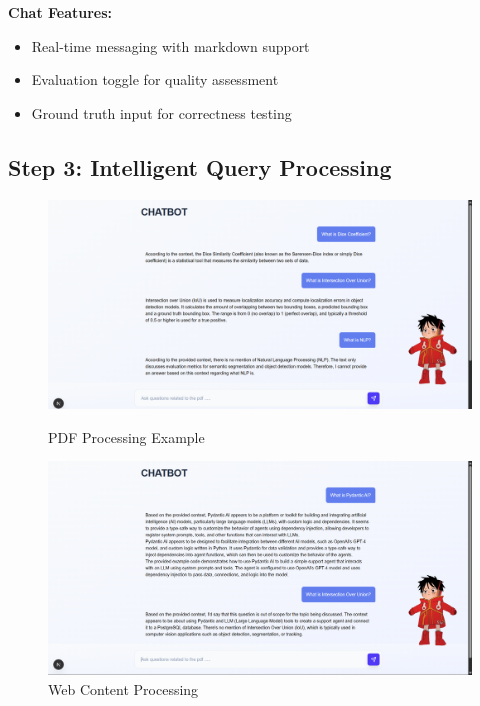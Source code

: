 \documentclass[12pt,a4paper]{article}
\begin{document}
\textbf{Chat Features:}
\begin{itemize}
    \item Real-time messaging with markdown support
    \item Evaluation toggle for quality assessment
    \item Ground truth input for correctness testing
\end{itemize}

\subsection{Step 3: Intelligent Query Processing}

\begin{figure}[h]
    \centering
    \begin{minipage}{0.45\textwidth}
        \centering
        \includegraphics[width=\textwidth]{screenshots/pdf_answers.png}
        \caption{PDF Processing Example}
    \end{minipage}
    \hfill
    \begin{minipage}{0.45\textwidth}
        \centering
        \includegraphics[width=\textwidth]{screenshots/url_answers.png}
        \caption{Web Content Processing}
    \end{minipage}
\end{figure}
\end{document}
